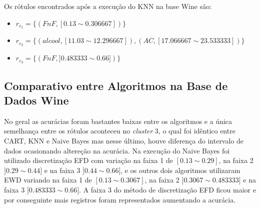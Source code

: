 Os rótulos encontrados após a execução do KNN na base Wine são:

\begin{itemize}[noitemsep] 
    \item ${r_{c_1}=\{ (FnF, [ 0.13 \sim  0.306667  ] ) \} }$
    \item ${r_{c_2}=\{(alcool,[ 11.03 \sim  12.296667 ]  ), (AC, [17.066667 \sim  23.533333 ] ) \} }$
    \item ${r_{c_3}=\{ (FnF, ] 0.483333 \sim  0.66 ])\} }$
 \end{itemize}



\subsection{Comparativo entre Algoritmos na Base de Dados Wine} \label{cap:resultados:ssec:compalgoritmos:wine}

No geral as acurácias foram bastantes baixas entre os algoritmos e a única semelhança entre os rótulos aconteceu no \textit{cluster} 3, o qual foi idêntico entre CART, KNN e Naive Bayes mas nesse último, houve diferença do intervalo de dados ocasionando altereção na acurácia. Na execução do Naive Bayes foi utilizado  discretização EFD com variação na faixa 1 de ${[0.13 \sim 0.29]}$, na faixa 2 ${]0.29 \sim 0.44]}$ e na faixa 3 ${]0.44 \sim 0.66]}$, e os outros dois algoritmos utilizaram EWD variando na faixa 1 de ${[0.13 \sim 0.3067]}$, na faixa 2 ${]0.3067 \sim 0.483333]}$ e na faixa 3 ${]0.483333 \sim 0.66]}$. A faixa 3 do método de discretização EFD ficou maior e por conseguinte mais registros foram representados aumentando a acurácia.


